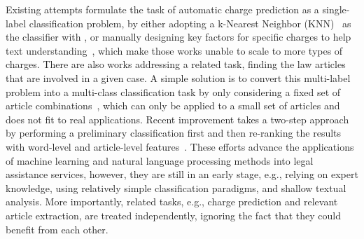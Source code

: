 Existing attempts formulate the task of automatic charge prediction as a single-label classification problem, 
by either adopting a k-Nearest Neighbor (KNN)~\cite{LIU2004case,liu2006exploring} as the classifier 
with ,
or manually designing key factors for specific charges to help text understanding~\cite{lin2012exploiting},
which make those works unable to scale to more types of charges. 
There are also works addressing a related task, finding the law articles that are involved in a given case.
A simple solution is to convert  this multi-label problem 
into a multi-class classification task by only considering a fixed set of article 
combinations~\cite{liu2005classifying,liu2006exploring}, which
can only be applied to a small set of articles and does not fit to real applications.  
Recent improvement takes a two-step approach by performing 
a preliminary classification first and then re-ranking the results with word-level and article-level features~\cite{liu2015predicting}. 
These efforts  advance the applications of machine learning and natural language processing methods into legal assistance services, however, they are still in an early stage, e.g., relying on expert knowledge, %
using relatively simple classification paradigms, and shallow textual analysis. More importantly, related tasks, e.g., charge prediction and relevant article extraction,  are 
treated independently, 
ignoring the fact that they could benefit from each other.  


